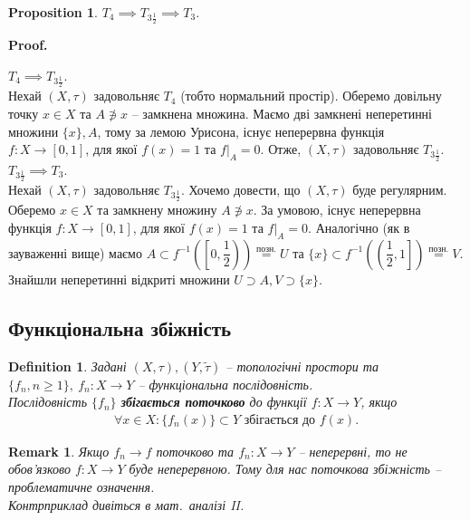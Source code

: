 \documentclass[a4paper, 10pt]{article}
\makeatletter
\theoremstyle{theoremdd}
\newtheorem{definition}[theorem]{Definition}
\newtheorem{proposition}[theorem]{Proposition}
\newtheorem{remark}[theorem]{Remark}
\renewenvironment{proof}[1][Proof.\\]{\par
\pushQED{\hfill \qed}%
\normalfont \topsep6\p@\@plus6\p@\relax
\trivlist
\item\relax
{\bfseries
#1\@addpunct{.}}\hspace\labelsep\ignorespaces
}{%
\popQED\endtrivlist\@endpefalse
}
\makeatother
\begin{document}
\begin{proposition}
$T_4 \implies T_{3 \frac{1}{2}} \implies T_3$.
\end{proposition}

\begin{proof}
$T_4 \implies T_{3 \frac{1}{2}}$.\\
Нехай $(X,\tau)$ задовольняє $T_4$ (тобто нормальний простір). Оберемо довільну точку $x \in X$ та $A \not\ni x$ -- замкнена множина. Маємо дві замкнені неперетинні множини $\{x\}, A$, тому за лемою Урисона, існує неперервна функція $f \colon X \to [0,1]$, для якої $f(x) = 1$ та $f|_A = 0$. Отже, $(X,\tau)$ задовольняє $T_{3 \frac{1}{2}}$.
\bigskip \\
$T_{3 \frac{1}{2}} \implies T_3$.\\
Нехай $(X,\tau)$ задовольняє $T_{3 \frac{1}{2}}$. Хочемо довести, що $(X,\tau)$ буде регулярним. Оберемо $x \in X$ та замкнену множину $A \not\ni x$. За умовою, існує неперервна функція $f \colon X \to [0,1]$, для якої $f(x) = 1$ та $f|_A = 0$. Аналогічно (як в зауваженні вище) маємо $A \subset f^{-1}\left( \left[0, \dfrac{1}{2}\right)\right) \overset{\text{позн.}}{=} U$ та $\{x\} \subset f^{-1}\left( \left(\dfrac{1}{2},1\right]\right) \overset{\text{позн.}}{=} V$. Знайшли неперетинні відкриті множини $U \supset A, V \supset \{x\}$.
\end{proof}

\subsection{Функціональна збіжність}
\begin{definition}
Задані $(X,\tau), (Y,\tilde{\tau})$ -- топологічні простори та $\{f_n, n \geq 1\},\ f_n \colon X \to Y$ -- функціональна послідовність.\\
Послідовність $\{f_n\}$ \textbf{збігається поточково} до функції $f \colon X \to Y$, якщо
\begin{align*}
\forall x \in X: \{f_n(x)\} \subset Y \text{ збігається до } f(x).
\end{align*}
\end{definition}

\begin{remark}
Якщо $f_n \to f$ поточково та $f_n \colon X \to Y$ -- неперервні, то не обов'язково $f \colon X \to Y$ буде неперервною. Тому для нас поточкова збіжність -- проблематичне означення.\\
\textit{Контрприклад дивіться в мат.\ аналізі II}.
\end{remark}
\end{document}
